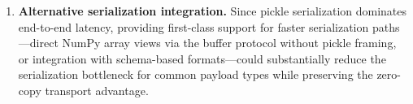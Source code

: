 \begin{enumerate}
    \item \textbf{Alternative serialization integration.} Since pickle serialization dominates end-to-end latency, providing first-class support for faster serialization paths---direct NumPy array views via the buffer protocol without pickle framing, or integration with schema-based formats---could substantially reduce the serialization bottleneck for common payload types while preserving the zero-copy transport advantage.
\end{enumerate}
